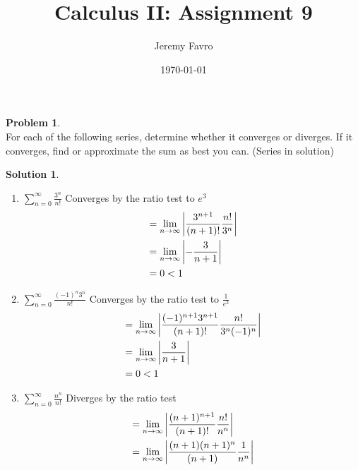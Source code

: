 \documentclass[10pt]{article}
\title{Calculus II: Assignment 9}
\author{Jeremy Favro}
\date{\today}
\theoremstyle{definition}
\newtheorem{problem}{Problem}
\newtheorem{soln}{Solution}
\begin{document}
\maketitle

\begin{problem} ~\\
For each of the following series, determine whether it converges or diverges. If it converges, find or approximate the sum as best you can. (Series in solution)
\end{problem}
\begin{soln} ~\\
     \begin{enumerate}[label=(\alph*)]
          \item $\displaystyle \sum_{n = 0}^{\infty} \frac{3^n}{n!}$ Converges by the ratio test to $e^3$
                \begin{align*}
                      & = \lim_{n \to \infty} \abs{\frac{3^{n+1}}{(n+1)!}\frac{n!}{3^n}} \\
                      & = \lim_{n \to \infty} \abs{-\frac{3}{n+1}}                       \\
                      & = 0<1                                                            \\
                \end{align*}
          \item $\displaystyle \sum_{n = 0}^{\infty} \frac{(-1)^n3^n}{n!}$ Converges by the ratio test to $\frac{1}{e^3}$
                \begin{align*}
                      & = \lim_{n \to \infty} \abs{\frac{(-1)^{n+1}3^{n+1}}{(n+1)!}\frac{n!}{3^n(-1)^n}} \\
                      & = \lim_{n \to \infty} \abs{\frac{3}{n+1}}                                        \\
                      & = 0<1                                                                            \\
                \end{align*}
          \item $\displaystyle \sum_{n = 0}^{\infty} \frac{n^n}{n!}$ Diverges by the ratio test
                \begin{align*}
                      & = \lim_{n \to \infty} \abs{\frac{(n+1)^{n+1}}{(n+1)!}\frac{n!}{n^n}} \\
                      & = \lim_{n \to \infty} \abs{\frac{(n+1)(n+1)^n}{(n+1)}\frac{1}{n^n}}  \\

\end{align*}
\end{enumerate}
\end{soln}
\end{document}

